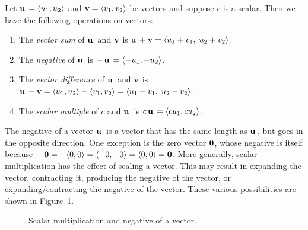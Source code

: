 \begin{definition}
\label{def:vectors_matrices:vector_operations}
Let $\operatorname*{\mathbf{u}}{} = \langle u_1, u_2 \rangle$ and
$\operatorname*{\mathbf{v}} = \langle v_1, v_2 \rangle$ be vectors and suppose
$c$ is a scalar. Then we have the following operations on vectors:
\begin{enumerate}
\item The \emph{vector sum} of $\operatorname*{\mathbf{u}}{}$ and
  $\operatorname*{\mathbf{v}}$ is $\operatorname*{\mathbf{u}}{} + \operatorname*{\mathbf{v}} = \langle u_1 + v_1,\; u_2 + v_2 \rangle$.

\item The \emph{negative} of $\operatorname*{\mathbf{u}}{}$ is
  $-\operatorname*{\mathbf{u}}{} = \langle -u_1, -u_2 \rangle$.

\item The \emph{vector difference} of $\operatorname*{\mathbf{u}}{}$ and
  $\operatorname*{\mathbf{v}}$ is $\operatorname*{\mathbf{u}}{} - \operatorname*{\mathbf{v}} =
  \langle u_1, u_2 \rangle - \langle v_1, v_2 \rangle = \langle u_1 -
  v_1,\; u_2 - v_2 \rangle$.

\item The \emph{scalar multiple} of $c$ and $\operatorname*{\mathbf{u}}{}$ is
  $c\operatorname*{\mathbf{u}}{} = \langle c u_1, c u_2 \rangle$.
\end{enumerate}
\end{definition}

The negative of a vector $\operatorname*{\mathbf{u}}{}$ is a vector that has the same
length as $\operatorname*{\mathbf{u}}{}$, but goes in the opposite direction. One
exception is the zero vector $\operatorname*{\textbf{0}}$, whose negative is itself
because $-\operatorname*{\textbf{0}} = -\langle 0,0 \rangle = \langle -0, -0 \rangle =
\langle 0,0 \rangle = \operatorname*{\textbf{0}}$. More generally, scalar
multiplication has the effect of scaling a vector. This may result in
expanding the vector, contracting it, producing the negative of the
vector, or expanding/contracting the negative of the vector. These
various possibilities are shown in
Figure~\ref{fig:scalar_multiply_negative}.

\begin{figure}[!htpb]
\centering
{}
\caption{Scalar multiplication and negative of a vector.}
\label{fig:scalar_multiply_negative}
\end{figure}

